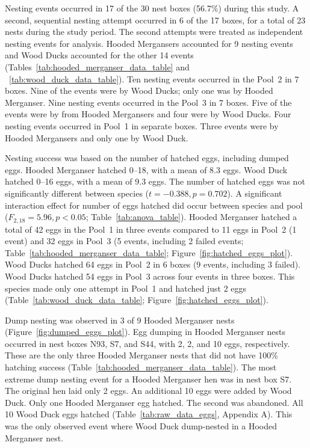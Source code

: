 Nesting events occurred in 17 of the 30 nest boxes (56.7\%) during this study. A second, sequential nesting attempt occurred in 6 of the 17 boxes, for a total of 23 nests during the study period. The second attempts were treated as independent nesting events for analysis. 
Hooded Mergansers accounted for 9 nesting events and Wood Ducks accounted for the other 14 events (Tables~\ref{tab:hooded_merganser_data_table} and ~\ref{tab:wood_duck_data_table}).  Ten nesting events occurred in the Pool~2 in 7 boxes. Nine of the events were by Wood Ducks; only one was by Hooded Merganser. Nine nesting events occurred in the Pool~3 in 7 boxes. Five of the events were by from Hooded Mergansers and four were by Wood Ducks. Four nesting events occurred in Pool~1 in separate boxes. Three events were by Hooded Mergansers and only one by Wood Duck. %





Nesting success was based on the number of hatched eggs, including dumped eggs. Hooded Merganser hatched \numrange[range-phrase = –]{0}{18}, with a mean of \num{8.3} eggs. Wood Duck hatched \numrange[range-phrase = –]{0}{16} eggs, with a mean of \num{9.3} eggs. The number of hatched eggs was not significantly different between species ($t = -0.388, p = 0.702$). A significant interaction effect for number of eggs hatched did occur between species and pool ($F_{2,18} = 5.96, p < 0.05$; Table~\ref{tab:anova_table}). Hooded Merganser hatched a total of 42 eggs in the Pool~1 in three events compared to 11 eggs in Pool~2  (1 event) and 32 eggs in Pool~3 (5 events, including 2 failed events; Table~\ref{tab:hooded_merganser_data_table}; Figure~\ref{fig:hatched_eggs_plot}). Wood Ducks hatched 64 eggs in Pool~2 in 6 boxes (9 events, including 3 failed). %
Wood Ducks hatched 54 eggs in Pool~3 across four events in three boxes. This species made only one attempt in Pool~1 and hatched just 2 eggs (Table~\ref{tab:wood_duck_data_table}; Figure~\ref{fig:hatched_eggs_plot}). 



 

Dump nesting was observed in 3 of 9 Hooded Merganser nests (Figure~\ref{fig:dumped_eggs_plot}). Egg dumping in Hooded Merganser nests occurred in nest boxes N93, S7, and S44, with 2, 2, and 10 eggs, respectively. These are the only three Hooded Merganser nests that did not have 100\% hatching success (Table~\ref{tab:hooded_merganser_data_table}). The most extreme dump nesting event for a Hooded Merganser hen was in nest box S7. The original hen laid only 2 eggs. An additional 10 eggs were added by Wood Duck. Only one Hooded Merganser egg hatched. The second was abandoned. All 10 Wood Duck eggs hatched (Table~\ref{tab:raw_data_eggs}, Appendix A). This was the only observed event where Wood Duck dump-nested in a Hooded Merganser nest.

